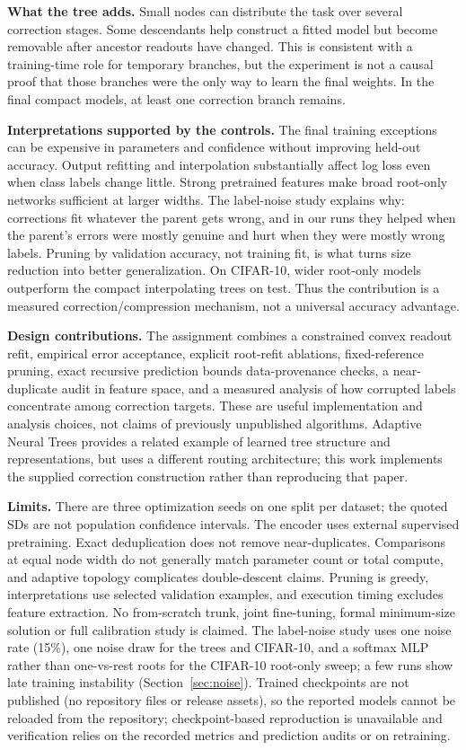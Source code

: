 \documentclass[11pt,a4paper]{article}
\begin{document}
\textbf{What the tree adds.} Small nodes can distribute the task over several correction stages. Some descendants help construct a fitted model but become removable after ancestor readouts have changed. This is consistent with a training-time role for temporary branches, but the experiment is not a causal proof that those branches were the only way to learn the final weights. In the final compact models, at least one correction branch remains.

\textbf{Interpretations supported by the controls.} The final training exceptions can be expensive in parameters and confidence without improving held-out accuracy. Output refitting and interpolation substantially affect log loss even when class labels change little. Strong pretrained features make broad root-only networks sufficient at larger widths. The label-noise study explains why: corrections fit whatever the parent gets wrong, and in our runs they helped when the parent's errors were mostly genuine and hurt when they were mostly wrong labels. Pruning by validation accuracy, not training fit, is what turns size reduction into better generalization. On CIFAR-10, wider root-only models outperform the compact interpolating trees on test. Thus the contribution is a measured correction/compression mechanism, not a universal accuracy advantage.

\textbf{Design contributions.} The assignment combines a constrained convex readout refit, empirical error acceptance, explicit root-refit ablations, fixed-reference pruning, exact recursive prediction bounds data-provenance checks, a near-duplicate audit in feature space, and a measured analysis of how corrupted labels concentrate among correction targets. These are useful implementation and analysis choices, not claims of previously unpublished algorithms. Adaptive Neural Trees \cite{ant} provides a related example of learned tree structure and representations, but uses a different routing architecture; this work implements the supplied correction construction rather than reproducing that paper.

\textbf{Limits.} There are three optimization seeds on one split per dataset; the quoted SDs are not population confidence intervals. The encoder uses external supervised pretraining. Exact deduplication does not remove near-duplicates. Comparisons at equal node width do not generally match parameter count or total compute, and adaptive topology complicates double-descent claims. Pruning is greedy, interpretations use selected validation examples, and execution timing excludes feature extraction. No from-scratch trunk, joint fine-tuning, formal minimum-size solution or full calibration study is claimed. The label-noise study uses one noise rate (15\%), one noise draw for the trees and CIFAR-10, and a softmax MLP rather than one-vs-rest roots for the CIFAR-10 root-only sweep; a few runs show late training instability (Section~\ref{sec:noise}). Trained checkpoints are not published (no repository files or release assets), so the reported models cannot be reloaded from the repository; checkpoint-based reproduction is unavailable and verification relies on the recorded metrics and prediction audits or on retraining.
\end{document}
